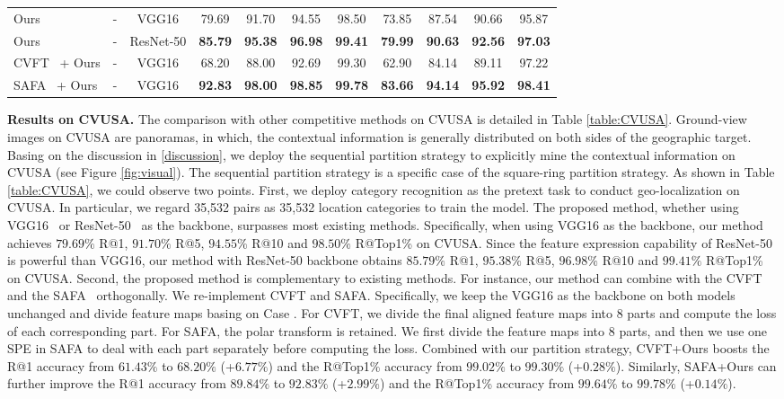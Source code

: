 \documentclass[journal]{IEEEtran}
\begin{document}
\begin{table*}[htp]
\begin{tabular}{l|c|c|cccc|cccc}
\hline
Ours & - & VGG16 & 79.69 & 91.70 & 94.55 & 98.50 & 73.85 & 87.54 & 90.66 & 95.87\\
Ours & - & ResNet-50 & \textbf{85.79} & \textbf{95.38} & \textbf{96.98} & \textbf{99.41} & \textbf{79.99} & \textbf{90.63} & \textbf{92.56} & \textbf{97.03}\\
CVFT~\cite{shi_optimal_nodate} + Ours & - & VGG16 & 68.20 & 88.00 & 92.69 & 99.30 & 62.90 & 84.14 & 89.11 & 97.22\\
SAFA~\cite{shi_spatial-aware_nodate} + Ours & - & VGG16 & \textbf{92.83} & \textbf{98.00} & \textbf{98.85} & \textbf{99.78} & \textbf{83.66} & \textbf{94.14} & \textbf{95.92} & \textbf{98.41}\\
\hline
\end{tabular}
\label{table:CVUSA}
\end{table*}
\textbf{Results on CVUSA.}
The comparison with other competitive methods on CVUSA is detailed in Table \ref{table:CVUSA}. 
Ground-view images on CVUSA are panoramas, in which, the contextual information is generally distributed on both sides of the geographic target. Basing on the discussion in \ref{discussion}, we deploy the sequential partition strategy to explicitly mine the contextual information on CVUSA (see Figure \ref{fig:visual}). The sequential partition strategy is a specific case of the square-ring partition strategy.
As shown in Table \ref{table:CVUSA}, we could observe two points. 
First, we deploy category recognition as the pretext task to conduct geo-localization on CVUSA. In particular, we regard 35,532 pairs as 35,532 location categories to train the model. The proposed method, whether using VGG16~\cite{vgg} or ResNet-50~\cite{he2016deep} as the backbone, surpasses most existing methods. Specifically, when using VGG16 as the backbone, our method achieves $79.69\%$ R@1, $91.70\%$ R@5, $94.55\%$ R@10 and $98.50\%$ R@Top1\% on CVUSA. Since the feature expression capability of ResNet-50 is powerful than VGG16, our method with ResNet-50 backbone obtains $85.79\%$ R@1, $95.38\%$ R@5, $96.98\%$ R@10 and $99.41\%$ R@Top1\% on CVUSA.
Second, the proposed method is complementary to existing methods. 
For instance, our method can combine with the CVFT~\cite{shi_optimal_nodate} and the SAFA~\cite{shi_spatial-aware_nodate} orthogonally. We re-implement CVFT and SAFA. Specifically, we keep the VGG16 as the backbone on both models unchanged and divide feature maps basing on Case \uppercase\expandafter{}. For CVFT, we divide the final aligned feature maps into 8 parts and compute the loss of each corresponding part. For SAFA, the polar transform is retained. We first divide the feature maps into 8 parts, and then we use one SPE in SAFA to deal with each part separately before computing the loss. 
Combined with our partition strategy, CVFT+Ours boosts the R@1 accuracy from $61.43\%$ to $68.20\%$ (+$6.77\%$) and the R@Top1\% accuracy from $99.02\%$ to $99.30\%$ (+$0.28\%$). Similarly, SAFA+Ours can further improve the R@1 accuracy from $89.84\%$ to $92.83\%$ (+$2.99\%$) and the R@Top1\% accuracy from $99.64\%$ to $99.78\%$ (+$0.14\%$).
\end{document}
